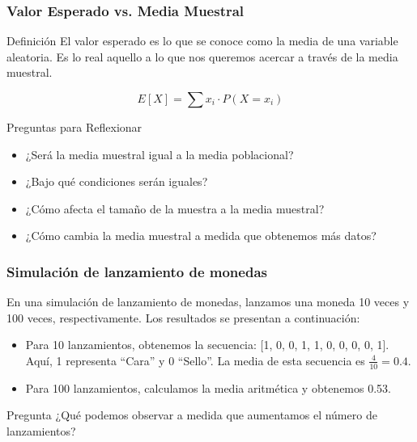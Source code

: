 \documentclass[aspectratio=169]{beamer}
\begin{document}


\begin{frame}
\frametitle{Valor Esperado vs. Media Muestral}
\begin{block}{Definición}
El valor esperado es lo que se conoce como la media de una variable aleatoria. Es lo real aquello a lo que nos queremos acercar a través de la media muestral.

\[
E[X] = \sum x_i \cdot P(X = x_i)
\]
\end{block}

\begin{block}{Preguntas para Reflexionar}
\begin{itemize}
    \item ¿Será la media muestral igual a la media poblacional?
    \item ¿Bajo qué condiciones serán iguales?
    \item ¿Cómo afecta el tamaño de la muestra a la media muestral?
    \item ¿Cómo cambia la media muestral a medida que obtenemos más datos?
\end{itemize}
\end{block}
\end{frame}


\begin{frame}
\frametitle{Simulación de lanzamiento de monedas}

En una simulación de lanzamiento de monedas, lanzamos una moneda 10 veces y 100 veces, respectivamente. Los resultados se presentan a continuación:

\begin{itemize}
    \item Para 10 lanzamientos, obtenemos la secuencia: [1, 0, 0, 1, 1, 0, 0, 0, 0, 1]. Aquí, 1 representa ``Cara'' y 0 ``Sello''. La media de esta secuencia es $\frac{4}{10} = 0.4$.

    \item Para 100 lanzamientos, calculamos la media aritmética y obtenemos 0.53.
\end{itemize}

\vfill

\begin{block}{Pregunta}
¿Qué podemos observar a medida que aumentamos el número de lanzamientos?
\end{block}
\end{frame}
\end{document}
